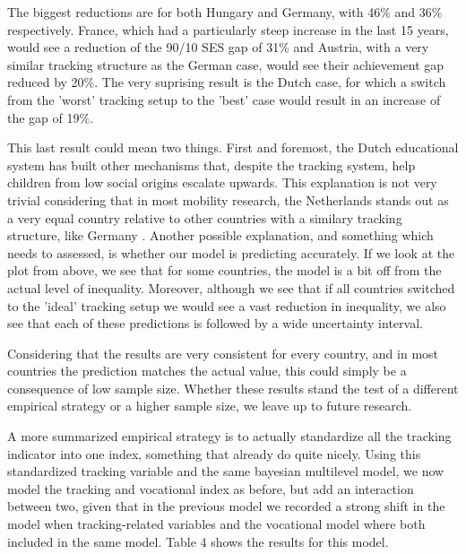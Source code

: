 \documentclass[11pt, a4paper]{article}\usepackage[]{graphicx}\usepackage[]{color}
\begin{document}
The biggest reductions are for both Hungary and Germany, with 46\% and 36\% respectively. France, which had a particularly steep increase in the last 15 years, would see a reduction of the 90/10 SES gap of 31\% and Austria, with a very similar tracking structure as the German case, would see their achievement gap reduced by 20\%. The very suprising result is the Dutch case, for which a switch from the 'worst' tracking setup to the 'best' case would result in an increase of the gap of 19\%.

This last result could mean two things. First and foremost, the Dutch educational system has built other mechanisms that, despite the tracking system, help children from low social origins escalate upwards. This explanation is not very trivial considering that in most mobility research, the Netherlands stands out as a very equal country relative to other countries with a similary tracking structure, like Germany \citep{shavit1993, esping2012}. Another possible explanation, and something which needs to assessed, is whether our model is predicting accurately. If we look at the plot from above, we see that for some countries, the model is a bit off from the actual level of inequality. Moreover, although we see that if all countries switched to the 'ideal' tracking setup we would see a vast reduction in inequality, we also see that each of these predictions is followed by a wide uncertainty interval. 

Considering that the results are very consistent for every country, and in most countries the prediction matches the actual value, this could simply be a consequence of low sample size. Whether these results stand the test of a different empirical strategy or a higher sample size, we leave up to future research.

A more summarized empirical strategy is to actually standardize all the tracking indicator into one index, something that \citet{bol2013} already do quite nicely. Using this standardized tracking variable and the same bayesian multilevel model, we now model the tracking and vocational index as before, but add an interaction between two, given that in the previous model we recorded a strong shift in the model when tracking-related variables and the vocational model where both included in the same model. Table 4 shows the results for this model.
\end{document}
